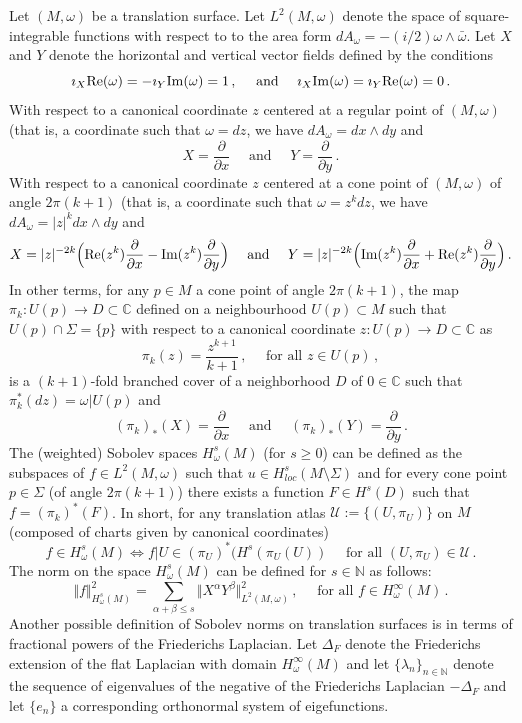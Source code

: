 \documentclass[11pt]{amsart}
\def\C{{\mathbb C}}
\newcommand \N {{ \mathbb N}}
\newcommand \re {{%
\operatorname{Re}
}}
\newcommand \im {{%
\operatorname{Im}
}}
\begin{document}
Let $(M, \omega)$ be a translation surface. Let $L^2(M, \omega)$ denote the space of square-integrable functions with respect to to the area form 
$dA_\omega = -(i/2) \omega \wedge \bar\omega$. Let $X$ and $Y$ denote the horizontal and vertical vector fields defined by the conditions
$$
\imath_X \re(\omega) = - \imath_Y \im(\omega) =  1\,, \quad \text{ and } \quad \imath_X \im(\omega) = \imath_Y \re(\omega) = 0\,.
$$
With respect to a canonical coordinate $z$ centered at a regular point of $(M, \omega)$ (that is, a coordinate such that $\omega= dz$, we 
have $dA_\omega =  dx \wedge dy$ and 
$$
X= \frac{\partial}{\partial x} \quad \text{ and } \quad Y= \frac{\partial}{\partial y}  \,.
$$
With respect to a canonical coordinate $z$ centered at a cone point of $(M, \omega)$ of angle $2\pi (k+1)$ (that is, a coordinate such that $\omega= z^k dz$, we  
have $dA_\omega =\vert z \vert^k dx \wedge dy$ and 
$$
X=  \vert z \vert^{-2k} \Big( \re(z^k)  \frac{\partial}{\partial x}  - \im(z^k) \frac{\partial}{\partial y}\Big)   \quad \text{ and } \quad 
Y=  \vert z \vert^{-2k} \Big( \im(z^k) \frac{\partial}{\partial x}  + \re(z^k) \frac{\partial}{\partial y}\Big)   \,.
$$
In other terms, for any $p\in M$ a cone point of angle $2\pi (k+1)$, the map $\pi_k : U(p) \to D \subset \C$ defined on a neighbourhood
$U(p) \subset M$ such that $U(p) \cap \Sigma=\{p\}$ with respect to a canonical coordinate $z: U(p) \to D \subset \C$ as
$$
\pi_k (z) =  \frac{ z^{k+1} }{k+1} \,, \quad \text{ for all } z\in U(p)\,,
$$
is a $(k+1)$-fold branched cover of a neighborhood $D$ of $0\in \C$ such that $\pi_k^\ast (dz) = \omega \vert U(p)$ and
$$
(\pi_k)_\ast (X) = \frac{\partial}{\partial x} \quad \text{ and } \quad  (\pi_k)_\ast  (Y) = \frac{\partial}{\partial y}  \,.
$$
The (weighted) Sobolev spaces $H^s_\omega (M)$ (for $s \geq 0$)  can be defined as the subspaces of $f\in L^2(M, \omega)$ such that 
$u \in H^s_{loc} (M\setminus \Sigma)$ and for every cone point $p\in \Sigma$ (of angle $2\pi (k+1)$) there exists a function 
$F \in H^s(D)$ such that $f = (\pi_k)^\ast (F)$.  In short, for any translation atlas $\mathcal U:=\{(U, \pi_U)\}$ on $M$ (composed of charts
given by canonical coordinates)
$$
f \in H^s_\omega (M)  \Longleftrightarrow     f \vert U \in (\pi_U)^\ast  ( H^s ( \pi_U (U) ) \quad \text{ for all  } (U, \pi_U) \in \mathcal U\,.
$$
The norm on the space $H^s_\omega(M)$ can be defined for $s \in \N$ as follows:
$$
\Vert f \Vert _{H^s_\omega(M)}^2 = \sum_{\alpha+\beta \leq s}  \Vert X^\alpha Y^\beta  \Vert^2_{L^2(M, \omega)} \,, \quad \text{ for all } f \in H^\infty_\omega(M)\,.
$$
Another possible definition of Sobolev norms on translation surfaces is in terms of fractional powers of the Friederichs Laplacian. Let $\Delta_F$ denote
the Friederichs extension of the flat Laplacian with domain $H^\infty_\omega(M)$ and let $\{\lambda_n\}_{n\in \N}$ denote the sequence of 
eigenvalues of the negative of the Friederichs Laplacian $-\Delta_F$ and let $\{ e_n\}$ a corresponding orthonormal system of eigefunctions. 
\end{document}
